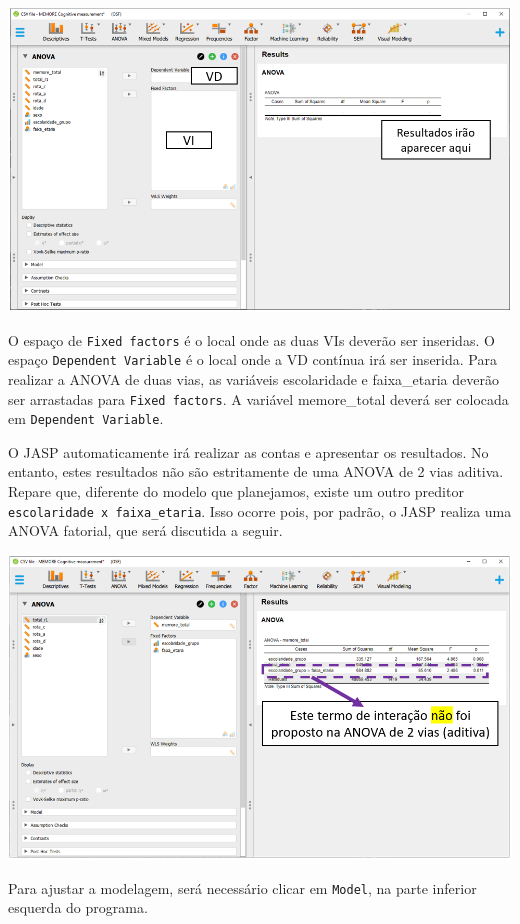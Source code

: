 \documentclass[
]{book}
\begin{document}
\includegraphics{./img/cap_anova_two_way_interface.png}

O espaço de \texttt{Fixed\ factors} é o local onde as duas VIs deverão ser inseridas. O espaço \texttt{Dependent\ Variable} é o local onde a VD contínua irá ser inserida. Para realizar a ANOVA de duas vias, as variáveis escolaridade e faixa\_etaria deverão ser arrastadas para \texttt{Fixed\ factors}. A variável memore\_total deverá ser colocada em \texttt{Dependent\ Variable}.

O JASP automaticamente irá realizar as contas e apresentar os resultados. No entanto, estes resultados não são estritamente de uma ANOVA de 2 vias aditiva. Repare que, diferente do modelo que planejamos, existe um outro preditor \texttt{escolaridade\ x\ faixa\_etaria}. Isso ocorre pois, por padrão, o JASP realiza uma ANOVA fatorial, que será discutida a seguir.

\includegraphics{./img/cap_anova_two_way_execucao.png}

Para ajustar a modelagem, será necessário clicar em \texttt{Model}, na parte inferior esquerda do programa.
\end{document}
